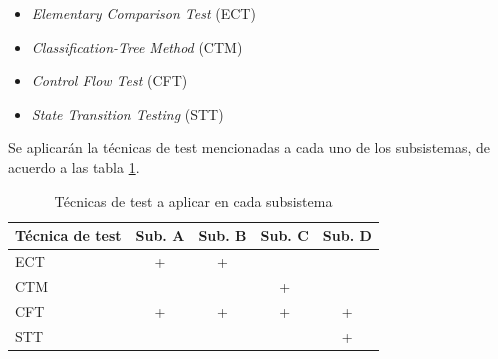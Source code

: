 \documentclass[
11pt, %
codirector, %
]{simple_charter}
\begin{document}
\begin{itemize}
	\item \textit{Elementary Comparison Test} (ECT)
	\item \textit{Classification-Tree Method} (CTM)
	\item \textit{Control Flow Test} (CFT)
	\item \textit{State Transition Testing} (STT)
\end{itemize}

Se aplicarán la técnicas de test mencionadas a cada uno de los subsistemas, de acuerdo a las tabla
\ref{tab:tec-subsys}.

\begin{table}[H]
\centering
\begin{tabular}{@{}lcccc@{}}
\toprule
Técnica de test & Sub. A & Sub. B & Sub. C & Sub. D \\ \midrule
ECT & + & + &  &  \\
CTM &  &  & + &  \\
CFT & + & + & + & + \\
STT &  &  &  & + \\ \bottomrule
\end{tabular}
\caption{Técnicas de test a aplicar en cada subsistema}
\label{tab:tec-subsys}
\end{table}
\end{document}
